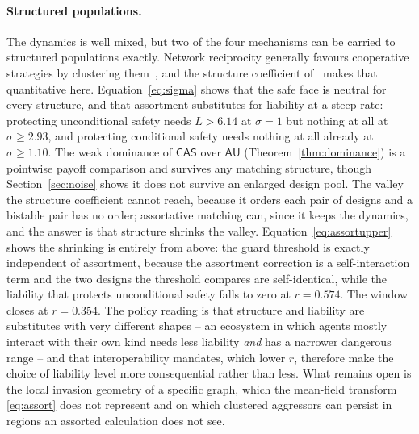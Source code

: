 \documentclass[11pt,a4paper]{article}
\theoremstyle{definition}
\newcommand{\AU}{\textsf{AU}}
\newcommand{\CAS}{\textsf{CAS}}
\begin{document}
\paragraph{Structured populations.}
The dynamics is well mixed, but two of the four mechanisms can be carried to
structured populations exactly. Network reciprocity generally favours
cooperative strategies by clustering them~\citep{ohtsuki2006simple,santos2006structured}, and the structure
coefficient of~\citet{tarnita2009strategy} makes that quantitative here.
Equation~\eqref{eq:sigma} shows that the safe face is neutral for every
structure, and that assortment substitutes for liability at a steep rate:
protecting unconditional safety needs $L>6.14$ at $\sigma=1$ but nothing at
all at $\sigma\ge2.93$, and protecting conditional safety needs nothing at all
already at $\sigma\ge1.10$. The weak dominance of $\CAS$ over $\AU$
(Theorem~\ref{thm:dominance}) is a pointwise payoff comparison and survives
any matching structure, though Section~\ref{sec:noise} shows it does not
survive an enlarged design pool. The valley the structure coefficient cannot
reach, because it orders each pair of designs and a bistable pair has no
order; assortative matching can, since it keeps the dynamics, and the answer
is that structure shrinks the valley. Equation~\eqref{eq:assortupper} shows
the shrinking is entirely from above: the guard threshold is exactly
independent of assortment, because the assortment correction is a
self-interaction term and the two designs the threshold compares are
self-identical, while the liability that protects unconditional safety falls
to zero at $r=0.574$. The window closes at $r=0.354$. The policy reading is
that structure and liability are substitutes with very different shapes -- an
ecosystem in which agents mostly interact with their own kind needs less
liability \emph{and} has a narrower dangerous range -- and that interoperability
mandates, which lower $r$, therefore make the choice of liability level more
consequential rather than less. What remains open is the local invasion
geometry of a specific graph, which the mean-field transform
\eqref{eq:assort} does not represent and on which clustered aggressors can
persist in regions an assorted calculation does not see.
\end{document}
